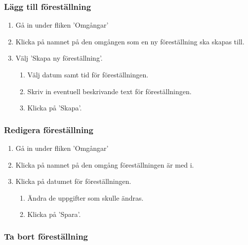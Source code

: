 \documentclass[a4paper, twoside, 11pt, titlepage]{article}
\begin{document}
		\subsubsection{Lägg till föreställning}


		\begin{enumerate}
		\item Gå in under fliken 'Omgångar'

		\item Klicka på namnet på den omgången som en ny föreställning ska skapas till.

		\item Välj 'Skapa ny föreställning'.

		\begin{enumerate}
		\item Välj datum samt tid för föreställningen.

		\item Skriv in eventuell beskrivande text för föreställningen.

		\item Klicka på 'Skapa'.
		\end{enumerate}
		\end{enumerate}

		\subsubsection{Redigera föreställning}


		\begin{enumerate}
		\item Gå in under fliken 'Omgångar'

		\item Klicka på namnet på den omgång föreställningen är med i.

		\item Klicka på datumet för föreställningen.

		\begin{enumerate}
		\item Ändra de uppgifter som skulle ändras.

		\item Klicka på 'Spara'.
		\end{enumerate}
		\end{enumerate}

		\subsubsection{Ta bort föreställning}
\end{document}
